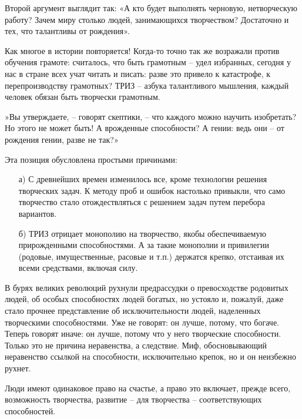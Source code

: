 \documentclass[11pt,a4paper]{article}
\begin{document}
Второй аргумент выглядит так: «А кто будет выполнять черновую, нетворческую
работу? Зачем миру столько людей, занимающихся творчеством? Достаточно и тех,
что талантливы от рождения».

Как многое в истории повторяется! Когда-то точно так же возражали против
обучения грамоте: считалось, что быть грамотным -- удел избранных, сегодня у
нас в стране всех учат читать и писать: разве это привело к катастрофе, к
перепроизводству грамотных? ТРИЗ -- азбука талантливого мышления, каждый
человек обязан быть творчески грамотным.

»Вы утверждаете, -- говорят скептики, -- что каждого можно научить изобретать?
Но этого не может быть! А врожденные способности? А гении: ведь они -- от
рождения гении, разве не так?»

Эта позиция обусловлена простыми причинами:
\begin{itemize}
\item[а)] С древнейших времен изменилось все, кроме технологии решения
  творческих задач. К методу проб и ошибок настолько привыкли, что само
  творчество стало отождествляться с решением задач путем перебора вариантов.
\item[б)] ТРИЗ отрицает монополию на творчество, якобы обеспечиваемую
  прирожденными способностями. А за такие монополии и привилегии (родовые,
  имущественные, расовые и т.п.) держатся крепко, отстаивая их всеми
  средствами, включая силу.
\end{itemize}
В бурях великих революций рухнули предрассудки о превосходстве родовитых
людей, об особых способностях людей богатых, но устояло и, пожалуй, даже стало
прочнее представление об исключительности людей, наделенных творческими
способностями. Уже не говорят: он лучше, потому, что богаче. Теперь говорят
иначе: он лучше, потому что у него творческие способности. Только это не
причина неравенства, а следствие. Миф, обосновывающий неравенство ссылкой на
способности, исключительно крепок, но и он неизбежно рухнет.

Люди имеют одинаковое право на счастье, а право это включает, прежде всего,
возможность творчества, развитие -- для творчества -- соответствующих
способностей.  
\end{document}
